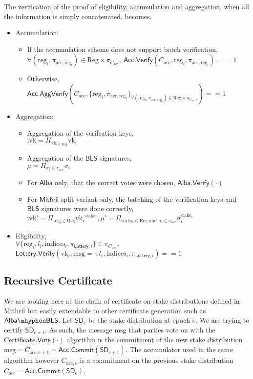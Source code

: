 \documentclass{article}
\newcommand{\isequal}{\ensuremath{==}\xspace}
\newcommand{\vk}[1]{\ensuremath{\textrm{vk}_{#1}}\xspace}
\newcommand{\m}{\ensuremath{\textrm{msg}}\xspace}
\newcommand{\acc}{\ensuremath{\textrm{acc}}\xspace}
\newcommand{\reg}[1]{\ensuremath{\textrm{reg}_{#1}}\xspace}
\newcommand{\stake}[1]{\ensuremath{\textrm{stake}_{#1}}\xspace}
\newcommand{\indices}[1]{\ensuremath{\textrm{indices}_{#1}}\xspace}
\newcommand{\ivk}{\ensuremath{\textrm{ivk}}\xspace}
\newcommand{\Acc}{\ensuremath{\mathsf{Acc}}\xspace}
\newcommand{\BLS}{\ensuremath{\mathsf{BLS}}\xspace}
\newcommand{\Mithril}{\ensuremath{\mathsf{Mithril}}\xspace}
\newcommand{\Alba}{\ensuremath{\mathsf{Alba}}\xspace}
\newcommand{\Lottery}{\ensuremath{\mathsf{Lottery}}\xspace}
\newcommand{\Vote}{\ensuremath{\mathsf{Vote}}\xspace}
\newcommand{\Verify}{\ensuremath{\mathsf{Verify}}\xspace}
\newcommand{\AggVerify}{\ensuremath{\mathsf{AggVerify}}\xspace}
\newcommand{\Commit}{\ensuremath{\mathsf{Commit}}\xspace}
\begin{document}
The verification of the proof of eligibility, accumulation and aggregation, when all the information is simply concatenated, becomes,
\begin{itemize}
    \item Accumulation: 
        \begin{itemize}
            \item If the accumulation scheme does not support batch verification,\\ 
            $\forall (\reg{i}, \pi_{\acc, \reg{i}}) \in \text{Reg} \times \pi_{C_\acc},\  \Acc.\Verify(C_\acc, \reg{i}, \pi_{\acc, \reg{i}}) \isequal 1 $
            \item Otherwise,\\
            $\Acc.\AggVerify(C_\acc, \{\reg{i}, \pi_{\acc, \reg{i}} \}_{\forall (\reg{i}, \pi_{\acc, \reg{i}}) \in \text{Reg} \times \pi_{C_\acc},}) \isequal 1 $
        \end{itemize} 
    \item Aggregation:
        \begin{itemize}
            \item Aggregation of the verifcation keys,\\ 
            $ \ivk = \Pi_{\vk{i \in \text{Reg}}} \vk{i}$
            \item Aggregation of the \BLS signatures,\\ 
            $ \mu = \Pi_{\sigma_i \in \pi_\acc} \sigma_{i}$
            \item For \Alba only, that the correct votes were chosen, $\Alba.\Verify(\cdot)$
            \item For \Mithril split variant only, the batching of the verification keys and \BLS signatures were done correctly, $\ivk' = \Pi_{\reg{i} \in \text{Reg} } \vk{i}^{\stake{i}}, \mu '= \Pi_{\stake{i} \in \text{Reg} \text{ and } \sigma_i \in \pi_\acc} \sigma_{i}^{\stake{i}} $
        \end{itemize}
    \item Eligibility, \\
        $\forall \{\reg{i}, l_i, \indices{i}, \pi_{\Lottery, i}\} \in \pi_{C_\acc},$\\$ \Lottery.\Verify(\vk{i}, \m=\cdot, l_i, \indices{i}, \pi_{\Lottery, i}) \isequal 1$
\end{itemize}

%
%
\subsection{Recursive Certificate}
We are looking here at the chain of certificate on stake distributions defined in Mithril but easily extendable to other certificate generation such as $\Alba\mhyphen\BLS$.
Let $\textsf{SD}_e$ be the stake distribution at epoch $e$. We are trying to certify $\textsf{SD}_{e+1}$. As such, the message \m that parties vote on with the $\text{Certificate}.\Vote(\cdot)$ algorithm is the commitment of the new stake distribution $\m = C_{\acc, e+1} = \Acc.\Commit(\textsf{SD}_{e+1})$. The accumulator used in the same algorithm however $C_{\acc,e}$ is a commitment on the previous stake distribution $C_\acc = \Acc.\Commit(\textsf{SD}_{e})$.
\end{document}
